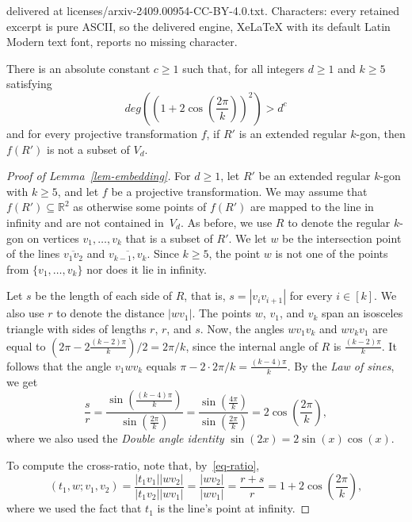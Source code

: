 \documentclass[10pt,a4paper]{amsart}
\begin{document}
delivered at licenses/arxiv-2409.00954-CC-BY-4.0.txt. Characters: every retained excerpt is pure ASCII, so the delivered engine, XeLaTeX with its default Latin Modern text font, reports no missing character.
\begin{lemma}
\label{lem-embedding}
There is an absolute constant $c \geq 1$ such that, for all integers $d \geq 1$ and $k \geq 5$ satisfying
\begin{equation}
\label{eq-condition}
deg\left(\left(1+2\cos\left(\frac{2\pi}{k}\right)\right)^2 \right) > d^c
\end{equation}
and for every projective transformation $f$, if $R'$ is an extended regular $k$-gon, then $f(R')$ is not a subset of $V_d$.
\end{lemma}

\begin{proof}[Proof of Lemma~\ref{lem-embedding}]
For $d \geq 1$, let $R'$ be an extended regular $k$-gon with $k \geq 5$, and let $f$ be a projective transformation.
We may assume that $f(R') \subseteq \mathbb{R}^2$ as otherwise some points of $f(R')$ are mapped to the line in infinity and are not contained in~$V_d$.
As before, we use $R$ to denote the regular $k$-gon on vertices $v_1,\dots,v_k$ that is a subset of $R'$.
We let $w$ be the intersection point of the lines $\overline{v_1v_2}$ and $\overline{v_{k-1},v_k}$.
Since $k \geq 5$, the point $w$ is not one of the points from $\{v_1,\dots,v_k\}$ nor does it lie in infinity.

Let $s$ be the length of each side of $R$, that is, $s=|v_iv_{i+1}|$ for every $i \in [k]$.
We also use $r$ to denote the distance $|wv_1|$.
The points $w$, $v_1$, and $v_k$ span an isosceles triangle with sides of lengths $r$, $r$, and $s$.
Now, the angles $wv_1v_k$ and $wv_kv_1$ are equal to $(2\pi - 2\frac{(k-2)\pi}{k})/2=2\pi/k$, since the internal angle of $R$ is $\frac{(k-2)\pi}{k}$.
It follows that the angle $v_1wv_k$ equals $\pi - 2 \cdot 2\pi/k = \frac{(k-4)\pi}{k}$.
By the \emph{Law of sines}, we get
\begin{equation}
\label{eq-ratio}
\frac{s}{r} = \frac{\sin\left(\frac{(k-4)\pi}{k}\right)}{\sin\left(\frac{2\pi}{k}\right)} = \frac{\sin\left(\frac{4\pi}{k}\right)}{\sin\left(\frac{2\pi}{k}\right)} = 2\cos\left(\frac{2\pi}{k}\right),
\end{equation}
where we also used the \emph{Double angle identity} $\sin(2x) = 2\sin(x)\cos(x)$.

To compute the cross-ratio, note that, by~\eqref{eq-ratio},
\begin{equation}
\label{eq-crossRatio}
(t_1,w;v_1,v_2) = \frac{|t_1v_1||wv_2|}{|t_1v_2||wv_1|} = \frac{|wv_2|}{|wv_1|} = \frac{r+s}{r} = 1+2\cos\left(\frac{2\pi}{k}\right),
\end{equation}
where we used the fact that $t_1$ is the line's point at infinity.


\end{proof}
\end{document}
